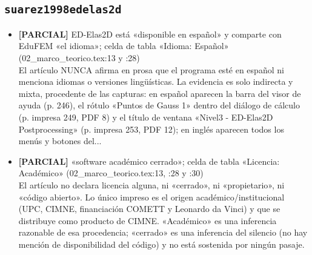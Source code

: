 \documentclass[11pt,a4paper]{article}
\newcommand{\campo}[1]{\textcolor{gris}{\footnotesize #1}}
\begin{document}
\subsection{\texttt{suarez1998edelas2d}}
\begin{itemize}\small
\item \textbf{[PARCIAL]} ED-Elas2D está «disponible en español» y comparte con EduFEM «el idioma»; celda de tabla «Idioma: Español» (02\_marco\_teorico.tex:13 y :28)
\\ \campo{El artículo NUNCA afirma en prosa que el programa esté en español ni menciona idiomas o versiones lingüísticas. La evidencia es solo indirecta y mixta, procedente de las capturas: en español aparecen la barra del visor de ayuda (p. 246), el rótulo «Puntos de Gauss 1» dentro del diálogo de cálculo (p. impresa 249, PDF 8) y el título de ventana «Nivel3 - ED-Elas2D Postprocessing» (p. impresa 253, PDF 12); en inglés aparecen todos los menús y botones del...}
\item \textbf{[PARCIAL]} «software académico cerrado»; celda de tabla «Licencia: Académico» (02\_marco\_teorico.tex:13, :28 y :30)
\\ \campo{El artículo no declara licencia alguna, ni «cerrado», ni «propietario», ni «código abierto». Lo único impreso es el origen académico/institucional (UPC, CIMNE, financiación COMETT y Leonardo da Vinci) y que se distribuye como producto de CIMNE. «Académico» es una inferencia razonable de esa procedencia; «cerrado» es una inferencia del silencio (no hay mención de disponibilidad del código) y no está sostenida por ningún pasaje.}
\end{itemize}
\end{document}
